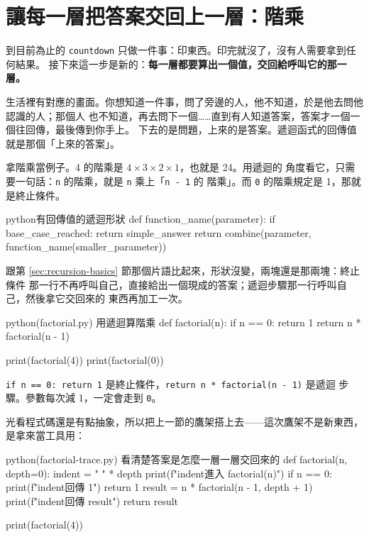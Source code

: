 \section{讓每一層把答案交回上一層：階乘}
\label{sec:recursion-return}

到目前為止的 \texttt{countdown} 只做一件事：印東西。印完就沒了，沒有人需要拿到任何結果。
接下來這一步是新的：\textbf{每一層都要算出一個值，交回給呼叫它的那一層。}

生活裡有對應的畫面。你想知道一件事，問了旁邊的人，他不知道，於是他去問他認識的人；那個人
也不知道，再去問下一個……直到有人知道答案，答案才一個一個往回傳，最後傳到你手上。
下去的是問題，上來的是答案。遞迴函式的回傳值就是那個「上來的答案」。

拿階乘當例子。4 的階乘是 $4 \times 3 \times 2 \times 1$，也就是 24。用遞迴的
角度看它，只需要一句話：\texttt{n} 的階乘，就是 \texttt{n} 乘上「\texttt{n - 1} 的
階乘」。而 \texttt{0} 的階乘規定是 1，那就是終止條件。

\begin{code}{python}{有回傳值的遞迴形狀}
def function_name(parameter):
    if base_case_reached:
        return simple_answer
    return combine(parameter, function_name(smaller_parameter))
\end{code}

跟第 \ref{sec:recursion-basics} 節那個片語比起來，形狀沒變，兩塊還是那兩塊：終止條件
那一行不再呼叫自己，直接給出一個現成的答案；遞迴步驟那一行呼叫自己，然後拿它交回來的
東西再加工一次。

\begin{example}{python}{(factorial.py) 用遞迴算階乘}
def factorial(n):
    if n == 0:
        return 1
    return n * factorial(n - 1)


print(factorial(4))
print(factorial(0))
\end{example}


\texttt{if n == 0: return 1} 是終止條件，\texttt{return n * factorial(n - 1)} 是遞迴
步驟。參數每次減 1，一定會走到 \texttt{0}。

光看程式碼還是有點抽象，所以把上一節的鷹架搭上去——這次鷹架不是新東西，是拿來當工具用：

\begin{example}{python}{(factorial-trace.py) 看清楚答案是怎麼一層一層交回來的}
def factorial(n, depth=0):
    indent = "    " * depth
    print(f"{indent}進入 factorial({n})")
    if n == 0:
        print(f"{indent}回傳 1")
        return 1
    result = n * factorial(n - 1, depth + 1)
    print(f"{indent}回傳 {result}")
    return result


print(factorial(4))
\end{example}

